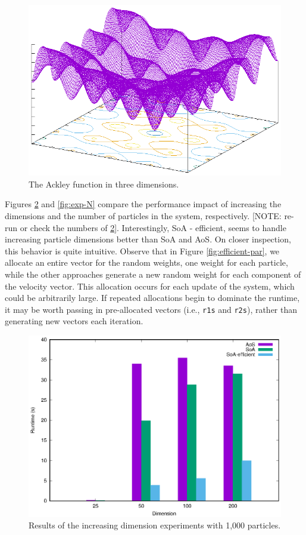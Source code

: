 \begin{figure}
  \includegraphics[width=\columnwidth]{../img/output/ackley}
  \caption{The Ackley function in three dimensions.}\label{fig:ackley}
\end{figure}

Figures \ref{fig:exp-dim} and \ref{fig:exp-N} compare the performance impact of
increasing the dimensions and the number of particles in the system,
respectively. [NOTE: re-run or check the numbers of
\ref{fig:exp-dim}]. Interestingly, SoA - efficient, seems to handle increasing
particle dimensions better than SoA and AoS. On closer inspection, this behavior
is quite intuitive. Observe that in Figure \ref{fig:efficient-par}, we allocate
an entire vector for the random weights, one weight for each particle, while the
other approaches generate a new random weight for each component of the velocity
vector. This
allocation occurs for each update of the system, which could be arbitrarily
large. If repeated allocations begin to dominate the runtime, it may be worth
passing in pre-allocated
vectors (i.e., \texttt{r1s} and \texttt{r2s}), rather than generating new
vectors each iteration.


\begin{figure}
  \includegraphics[width=\columnwidth]{../img/output/dim}
  \caption{Results of the increasing dimension experiments with 1,000
    particles.}
  \label{fig:exp-dim}
\end{figure}

